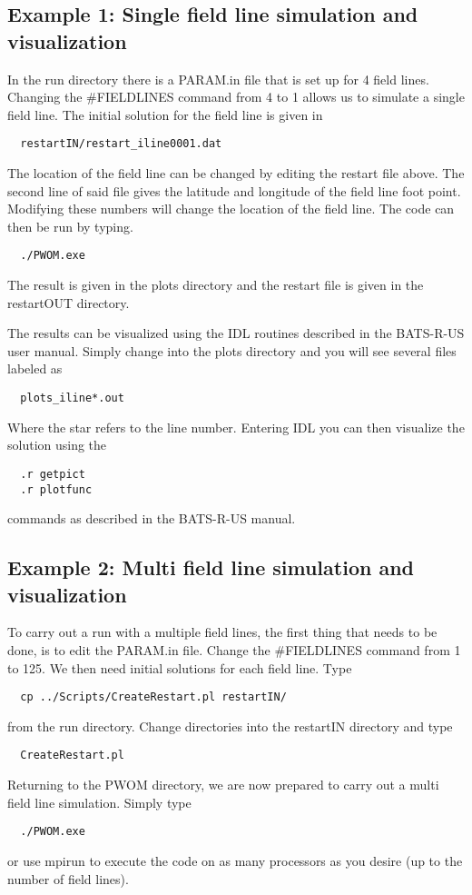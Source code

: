\subsection{Example 1: Single field line simulation and visualization}
In the run directory there is a PARAM.in file that is set up for 4 
field lines. Changing the \#FIELDLINES command from 4 to 1 allows us to 
simulate a single field line. The initial solution for the field line 
is given in 
\begin{verbatim}
  restartIN/restart_iline0001.dat
\end{verbatim}
The location of the field line can be changed by editing the restart file 
above. The second line of said file gives the latitude and longitude of the 
field line foot point. Modifying these numbers will change the location of the 
field line. The code can then be run by typing. 
\begin{verbatim}
  ./PWOM.exe
\end{verbatim}
The result is given in the plots directory and the restart file is given in 
the restartOUT directory.

The results can be visualized using the IDL routines described in the 
BATS-R-US user manual. Simply change into the plots directory and you will see 
several files labeled as
\begin{verbatim}
  plots_iline*.out
\end{verbatim}
Where the star refers to the line number. Entering IDL you can then visualize 
the solution using the 
\begin{verbatim}
  .r getpict
  .r plotfunc
\end{verbatim}
commands as described in the BATS-R-US manual. 
\subsection{Example 2: Multi field line simulation and visualization}
To carry out a run with a multiple field lines, the first thing that 
needs to be done, is to edit the PARAM.in file. Change the \#FIELDLINES 
command 
from 1 to 125. We then need initial solutions for each field line. Type
\begin{verbatim}
  cp ../Scripts/CreateRestart.pl restartIN/
\end{verbatim}
from the run directory. Change directories into the restartIN directory and 
type
\begin{verbatim}
  CreateRestart.pl 
\end{verbatim}
Returning to the PWOM directory, we are now prepared to carry out a multi field 
line simulation. Simply type 
\begin{verbatim}
  ./PWOM.exe
\end{verbatim}
or use mpirun to execute the code on as many processors as you desire (up to 
the number of field lines).

